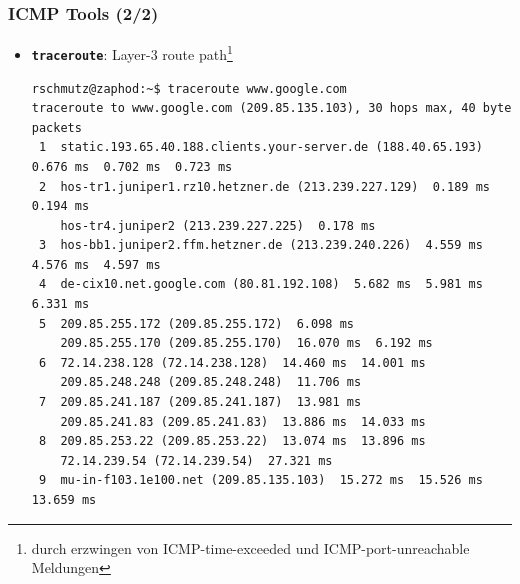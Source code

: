 \documentclass{beamer}
\begin{document}
\begin{frame}[fragile]
\frametitle{ICMP Tools (2/2)}
\begin{itemize}
	\item{\textbf{\texttt{traceroute}}: Layer-3 route path\footnote{durch erzwingen von 		ICMP-time-exceeded und ICMP-port-unreachable Meldungen}}
\begin{tiny}
		\begin{verbatim}
rschmutz@zaphod:~$ traceroute www.google.com
traceroute to www.google.com (209.85.135.103), 30 hops max, 40 byte packets
 1  static.193.65.40.188.clients.your-server.de (188.40.65.193)  0.676 ms  0.702 ms  0.723 ms
 2  hos-tr1.juniper1.rz10.hetzner.de (213.239.227.129)  0.189 ms  0.194 ms
    hos-tr4.juniper2 (213.239.227.225)  0.178 ms
 3  hos-bb1.juniper2.ffm.hetzner.de (213.239.240.226)  4.559 ms  4.576 ms  4.597 ms
 4  de-cix10.net.google.com (80.81.192.108)  5.682 ms  5.981 ms  6.331 ms
 5  209.85.255.172 (209.85.255.172)  6.098 ms
    209.85.255.170 (209.85.255.170)  16.070 ms  6.192 ms
 6  72.14.238.128 (72.14.238.128)  14.460 ms  14.001 ms
    209.85.248.248 (209.85.248.248)  11.706 ms
 7  209.85.241.187 (209.85.241.187)  13.981 ms
    209.85.241.83 (209.85.241.83)  13.886 ms  14.033 ms
 8  209.85.253.22 (209.85.253.22)  13.074 ms  13.896 ms
    72.14.239.54 (72.14.239.54)  27.321 ms
 9  mu-in-f103.1e100.net (209.85.135.103)  15.272 ms  15.526 ms  13.659 ms
\end{verbatim}
\end{tiny}
\end{itemize}
\end{frame}
\end{document}
